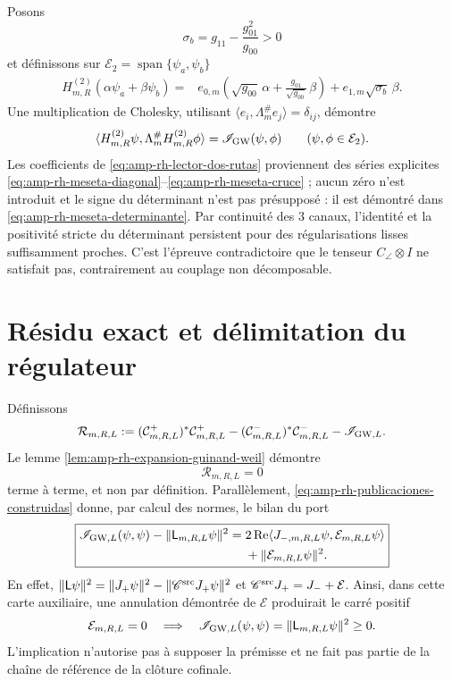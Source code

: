 Posons
\[
 \sigma_b=g_{11}-\frac{g_{01}^2}{g_{00}}>0
\]
et définissons sur \(\mathcal E_2=\operatorname{span}\{\psi_a,\psi_b\}\)
\begin{align}
 H^{(2)}_{m,R}(\alpha\psi_a+\beta\psi_b)
 ={}&
 e_{0,m}\left(
 \sqrt{g_{00}}\,\alpha
 +\frac{g_{01}}{\sqrt{g_{00}}}\,\beta\right)
 +e_{1,m}\sqrt{\sigma_b}\,\beta .
 \label{eq:amp-rh-lector-dos-rutas}
\end{align}
Une multiplication de Cholesky, utilisant \(\langle e_i,\Lambda_m^\#e_j\rangle=\delta_{ij}\), démontre
\begin{equation}\label{eq:amp-rh-meseta-energia-exacta}
 \langle H^{(2)}_{m,R}\psi,
         \Lambda_m^\#H^{(2)}_{m,R}\phi\rangle
 =\mathscr I_{\rm GW}(\psi,\phi)
 \qquad(\psi,\phi\in\mathcal E_2).
\end{equation}
Les coefficients de \eqref{eq:amp-rh-lector-dos-rutas} proviennent des séries explicites \eqref{eq:amp-rh-meseta-diagonal}--\eqref{eq:amp-rh-meseta-cruce} ; aucun zéro n'est introduit et le signe du déterminant n'est pas présupposé : il est démontré dans \eqref{eq:amp-rh-meseta-determinante}. Par continuité des \(3\) canaux, l'identité et la positivité stricte du déterminant persistent pour des régularisations lisses suffisamment proches. C'est l'épreuve contradictoire que le tenseur \(C_\angle\otimes I\) ne satisfait pas, contrairement au couplage non décomposable.

\section*{Résidu exact et délimitation du régulateur}

Définissons
\begin{equation}\label{eq:amp-rh-residual-finito}
 \mathcal R_{m,R,L}
 :=
 (\mathcal C^+_{m,R,L})^*\mathcal C^+_{m,R,L}
 -(\mathcal C^-_{m,R,L})^*\mathcal C^-_{m,R,L}
 -\mathscr I_{{\rm GW},L}.
\end{equation}
Le lemme \ref{lem:amp-rh-expansion-guinand-weil} démontre
\[
 \mathcal R_{m,R,L}=0
\]
terme à terme, et non par définition. Parallèlement, \eqref{eq:amp-rh-publicaciones-construidas} donne, par calcul des normes, le bilan du port
\begin{equation}\label{eq:amp-rh-balance-residual-puerto}
 \boxed{
 \begin{aligned}
 \mathscr I_{{\rm GW},L}(\psi,\psi)
 -\|\mathsf L_{m,R,L}\psi\|^2
 ={}&2\operatorname{Re}
 \langle J_{-,m,R,L}\psi,\mathcal E_{m,R,L}\psi\rangle\\
 &+\|\mathcal E_{m,R,L}\psi\|^2 .
 \end{aligned}}
\end{equation}
En effet, \(\|\mathsf L\psi\|^2
=\|J_+\psi\|^2-\|\mathscr C^{\rm src}J_+\psi\|^2\) et \(\mathscr C^{\rm src}J_+=J_-+\mathcal E\). Ainsi, dans cette carte auxiliaire, une annulation démontrée de \(\mathcal E\) produirait le carré positif
\begin{equation}\label{eq:amp-rh-cuadrado-regulado}
 \mathcal E_{m,R,L}=0
 \quad\Longrightarrow\quad
 \mathscr I_{{\rm GW},L}(\psi,\psi)
 =\|\mathsf L_{m,R,L}\psi\|^2\geq0.
\end{equation}
L'implication n'autorise pas à supposer la prémisse et ne fait pas partie de la chaîne de référence de la clôture cofinale.

